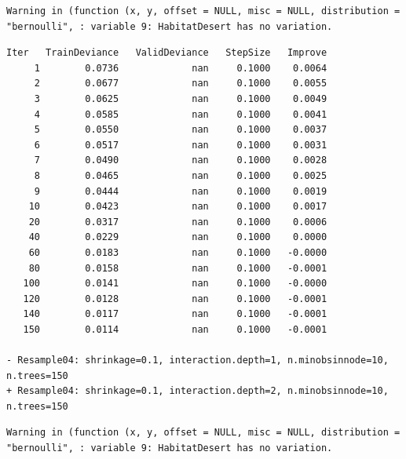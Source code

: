\documentclass[
  letterpaper,
  DIV=11,
  numbers=noendperiod]{scrartcl}
\begin{document}
\begin{verbatim}
Warning in (function (x, y, offset = NULL, misc = NULL, distribution =
"bernoulli", : variable 9: HabitatDesert has no variation.
\end{verbatim}

\begin{verbatim}
Iter   TrainDeviance   ValidDeviance   StepSize   Improve
     1        0.0736             nan     0.1000    0.0064
     2        0.0677             nan     0.1000    0.0055
     3        0.0625             nan     0.1000    0.0049
     4        0.0585             nan     0.1000    0.0041
     5        0.0550             nan     0.1000    0.0037
     6        0.0517             nan     0.1000    0.0031
     7        0.0490             nan     0.1000    0.0028
     8        0.0465             nan     0.1000    0.0025
     9        0.0444             nan     0.1000    0.0019
    10        0.0423             nan     0.1000    0.0017
    20        0.0317             nan     0.1000    0.0006
    40        0.0229             nan     0.1000    0.0000
    60        0.0183             nan     0.1000   -0.0000
    80        0.0158             nan     0.1000   -0.0001
   100        0.0141             nan     0.1000   -0.0000
   120        0.0128             nan     0.1000   -0.0001
   140        0.0117             nan     0.1000   -0.0001
   150        0.0114             nan     0.1000   -0.0001

- Resample04: shrinkage=0.1, interaction.depth=1, n.minobsinnode=10, n.trees=150 
+ Resample04: shrinkage=0.1, interaction.depth=2, n.minobsinnode=10, n.trees=150 
\end{verbatim}

\begin{verbatim}
Warning in (function (x, y, offset = NULL, misc = NULL, distribution =
"bernoulli", : variable 9: HabitatDesert has no variation.
\end{verbatim}
\end{document}
